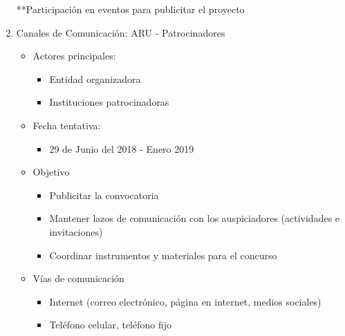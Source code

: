 \documentclass{article}
\begin{document}
\begin{enumerate}
**Participación en eventos para publicitar el proyecto

\item Canales de Comunicación: ARU - Patrocinadores
\begin{itemize}
\item Actores principales:
\begin{itemize}
\item Entidad organizadora
\item Instituciones patrocinadoras
\end{itemize}
\item Fecha tentativa:
\begin{itemize}
\item 29 de Junio del 2018 - Enero 2019
\end{itemize}
\item Objetivo
\begin{itemize}
\item Publicitar la convocatoria
\item Mantener lazos de comunicación con los auspiciadores (actividades e invitaciones)
\item Coordinar instrumentos y materiales para el concurso
\end{itemize}
\item Vías de comunicación
\begin{itemize}
\item Internet (correo electrónico, página en internet, medios sociales)
\item Teléfono celular, teléfono fijo
\end{itemize}
\end{itemize}


\end{enumerate}
\end{document}
